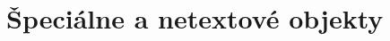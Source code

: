 \documentclass[../../thesis.tex]{subfiles}
\begin{document}
\section{Špeciálne a netextové objekty}





\end{document}

